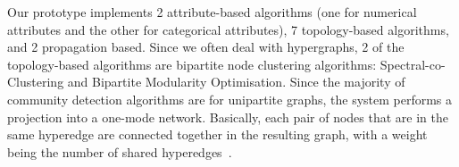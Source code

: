 



Our prototype implements 2 attribute-based algorithms (one for numerical attributes and the other for categorical attributes), 7 topology-based algorithms, and 2 propagation based. Since we often deal with hypergraphs, 2 of the topology-based algorithms are bipartite node clustering algorithms: Spectral-co-Clustering \cite{dhillonCoclusteringDocumentsWords2001} and Bipartite Modularity Optimisation\cite{guimeraModuleIdentificationBipartite2007}. Since the majority of community detection algorithms are for unipartite graphs, the system performs a projection into a one-mode network. Basically, each pair of nodes that are in the same hyperedge are connected together in the resulting graph, with a weight being the number of shared hyperedges~\cite{guimeraModuleIdentificationBipartite2007}.

